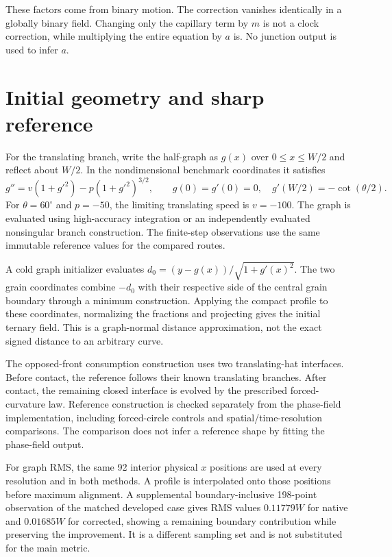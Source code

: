 \documentclass[a4paper,11pt]{article}
\begin{document}
These factors come from binary motion. The correction vanishes identically in a globally binary field. Changing only the capillary term by $m$ is not a clock correction, while multiplying the entire equation by $a$ is. No junction output is used to infer $a$.

\section{Initial geometry and sharp reference}
For the translating branch, write the half-graph as $g(x)$ over $0\leq x\leq W/2$ and reflect about $W/2$. In the nondimensional benchmark coordinates it satisfies
\begin{equation}
 g''=v(1+g'^2)-p(1+g'^2)^{3/2},
 \qquad g(0)=g'(0)=0,\quad
 g'(W/2)=-\cot(\theta/2).
\end{equation}
For $\theta=60^\circ$ and $p=-50$, the limiting translating speed is $v=-100$. The graph is evaluated using high-accuracy integration or an independently evaluated nonsingular branch construction. The finite-step observations use the same immutable reference values for the compared routes.

A cold graph initializer evaluates $d_0=(y-g(x))/\sqrt{1+g'(x)^2}$. The two grain coordinates combine $-d_0$ with their respective side of the central grain boundary through a minimum construction. Applying the compact profile to these coordinates, normalizing the fractions and projecting gives the initial ternary field. This is a graph-normal distance approximation, not the exact signed distance to an arbitrary curve.

The opposed-front consumption construction uses two translating-hat interfaces. Before contact, the reference follows their known translating branches. After contact, the remaining closed interface is evolved by the prescribed forced-curvature law. Reference construction is checked separately from the phase-field implementation, including forced-circle controls and spatial/time-resolution comparisons. The comparison does not infer a reference shape by fitting the phase-field output.

For graph RMS, the same 92 interior physical $x$ positions are used at every resolution and in both methods. A profile is interpolated onto those positions before maximum alignment. A supplemental boundary-inclusive 198-point observation of the matched developed case gives RMS values $0.11779W$ for native and $0.01685W$ for corrected, showing a remaining boundary contribution while preserving the improvement. It is a different sampling set and is not substituted for the main metric.
\end{document}
